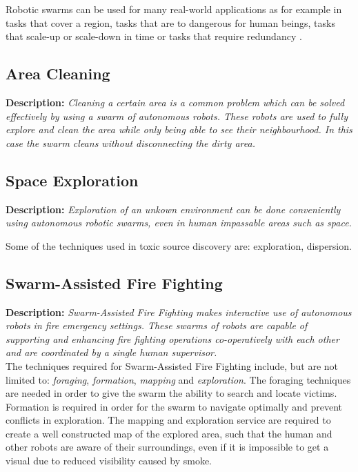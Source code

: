 Robotic swarms can be used for many real-world applications as for example in tasks that cover a region, tasks that are to dangerous for human beings, tasks that scale-up or scale-down in time or tasks that require redundancy \cite{csahin2005swarm}.

  \subsection{Area Cleaning}
  \textbf{Description: }\emph{Cleaning a certain area is a common problem which can be solved effectively by using a swarm of autonomous robots. These robots are used to fully explore and clean the area while only being able to see their neighbourhood. In this case the swarm cleans without disconnecting the dirty area.}  \cite{wagner2008cooperative} 
  
  
  \subsection{Space Exploration}
  \textbf{Description: }\emph{Exploration of an unkown environment can be done conveniently using autonomous robotic swarms, even in human impassable areas such as space.} \cite{sheng2006distributed}
  
  Some of the techniques used in toxic source discovery are: exploration, dispersion.
  
  \subsection{Swarm-Assisted Fire Fighting}
  \textbf{Description: }\emph{Swarm-Assisted Fire Fighting makes interactive use of autonomous robots in fire emergency settings. These swarms of robots are capable of supporting and enhancing fire fighting operations co-operatively with each other and are coordinated by a single human supervisor.}\cite{Naghsh2008,Penders2011}\\

  The techniques required for Swarm-Assisted Fire Fighting include, but are not limited to: \emph{foraging}, \emph{formation}, \emph{mapping} and \emph{exploration}.\cite{Naghsh2008,Penders2011} The foraging techniques are needed in order to give the swarm the ability to search and locate victims. Formation is required in order for the swarm to navigate optimally and prevent conflicts in exploration. The mapping and exploration service are required to create a well constructed map of the explored area, such that the human and other robots are aware of their surroundings, even if it is impossible to get a visual due to reduced visibility caused by smoke.

